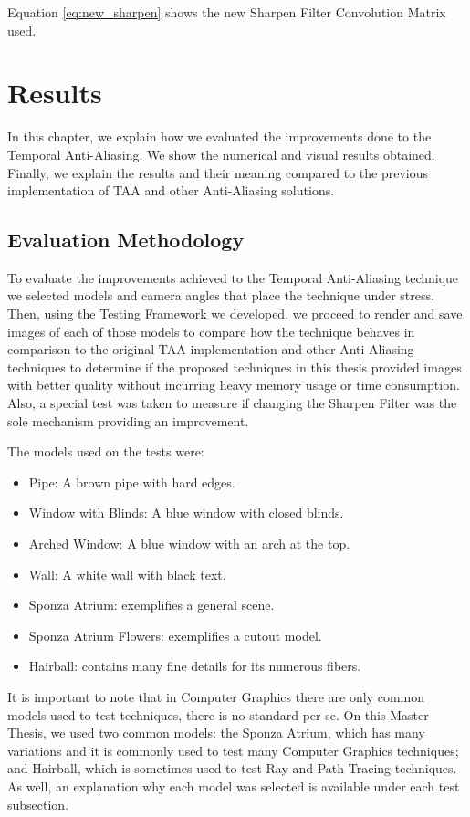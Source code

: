 \documentclass[pregrado]{tesis-usb} %
\begin{document}
Equation \ref{eq:new_sharpen} shows the new Sharpen Filter Convolution Matrix used.


\chapter{Results}
In this chapter, we explain how we evaluated the improvements done to the Temporal Anti-Aliasing. We show the numerical and visual results obtained. Finally, we explain the results and their meaning compared to the previous implementation of TAA and other Anti-Aliasing solutions.
\section{Evaluation Methodology}
To evaluate the improvements achieved to the Temporal Anti-Aliasing technique we selected models and camera angles that place the technique under stress. Then, using the Testing Framework we developed, we proceed to render and save images of each of those models to compare how the technique behaves in comparison to the original TAA implementation and other Anti-Aliasing techniques to determine if the proposed techniques in this thesis provided images with better quality without incurring heavy memory usage or time consumption. Also, a special test was taken to measure if changing the Sharpen Filter was the sole mechanism providing an improvement.

The models used on the tests were:
\begin{itemize}
\item Pipe: A brown pipe with hard edges.
\item Window with Blinds: A blue window with closed blinds.
\item Arched Window: A blue window with an arch at the top.
\item Wall: A white wall with black text.
\item Sponza Atrium: exemplifies a general scene.
\item Sponza Atrium Flowers: exemplifies a cutout model.
\item Hairball: contains many fine details for its numerous fibers.
\end{itemize}

It is important to note that in Computer Graphics there are only common models used to test techniques, there is no standard per se. On this Master Thesis, we used two common models: the Sponza Atrium, which has many variations and it is commonly used to test many Computer Graphics techniques; and Hairball, which is sometimes used to test Ray and Path Tracing techniques. As well, an explanation why each model was selected is available under each test subsection.
\end{document}
